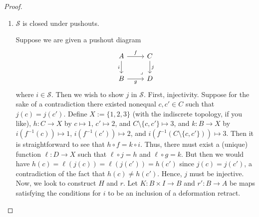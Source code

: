 \documentclass{amsart}
\theoremstyle{plain}
\theoremstyle{definition}
\newcommand{\0}{\mathbf{0}}
\newcommand{\cS}{\mathcal S}
\renewcommand{\(}{\left(}
\renewcommand{\)}{\right)}
\begin{document}
\begin{proof}
\begin{enumerate}[listparindent=\parindent,parsep=0pt]
    \item $\cS$ is closed under pushouts.
    
    Suppose we are given a pushout diagram
    \[\begin{tikzcd}
      A & C \\
      B & D
      \arrow["i"', from=1-1, to=2-1]
      \arrow["g"', from=2-1, to=2-2]
      \arrow["f", from=1-1, to=1-2]
      \arrow["j", from=1-2, to=2-2]
      \arrow["\ulcorner"{anchor=center, pos=0.125, rotate=180}, draw=none, from=2-2, to=1-1]
    \end{tikzcd}\]
    where $i\in\cS$. Then we wish to show $j$ in $\cS$. First, injectivity. Suppose for the sake of a contradiction there existed nonequal $c,c'\in C$ such that $j(c)=j(c')$. Define $X:=\{1,2,3\}$ (with the indiscrete topology, if you like), $h:C\to X$ by $c\mapsto 1$, $c'\mapsto2$, and $C\setminus\{c,c'\}\mapsto 3$, and $k:B\to X$ by $i(f^{-1}(c))\mapsto 1$, $i(f^{-1}(c'))\mapsto 2$, and $i(f^{-1}(C\setminus\{c,c'\}))\mapsto 3$. Then it is straightforward to see that $h\circ f=k\circ i$. Thus, there must exist a (unique) function $\ell:D\to X$ such that $\ell\circ j=h$ and $\ell\circ g=k$. But then we would have $h(c)=\ell(j(c))=\ell(j(c'))=h(c')$ since $j(c)=j(c')$, a contradiction of the fact that $h(c)\neq h(c')$. Hence, $j$ must be injective. Now, we look to construct $H$ and $r$. Let $K:B\times I\to B$ and $r':B\to A$ be maps satisfying the conditions for $i$ to be an inclusion of a deformation retract.


\end{enumerate}
\end{proof}
\end{document}
